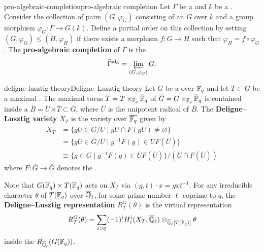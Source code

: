 \begin{topic}{pro-algebraic-completion}{pro-algebraic completion}
    Let $\Gamma$ be a  and $k$ be a . Consider the collection of pairs $(G, \varphi_G)$ consisting of an   $G$ over $k$ and a group morphism $\varphi_G \colon \Gamma \to G(k)$. Define a partial order on this collection by setting $(G, \varphi_G) \le (H, \varphi_H)$ if there exists a morphism $f \colon G \to H$ such that $\varphi_H = f \circ \varphi_G$. The \textbf{pro-algebraic completion} of $\Gamma$ is the 
    \[ \widehat{\Gamma}^\textup{alg} = \varprojlim_{(G, \varphi_G)} G . \]
\end{topic}

\begin{topic}{deligne-lusztig-theory}{Deligne--Lusztig theory}
    Let $G$ be a    over $\mathbb{F}_q$ and let $T \subset G$ be a maximal . The maximal torus $\overline{T} = T \times_{\mathbb{F}_q} \overline{\mathbb{F}}_q$ of $\overline{G} = G \times_{\mathbb{F}_q} \overline{\mathbb{F}}_q$ is contained inside a  $\overline{B} = \overline{U} \rtimes \overline{T} \subset \overline{G}$, where $\overline{U}$ is the unipotent radical of $\overline{B}$.
    The \textbf{Deligne--Lusztig variety} $X_T$ is the variety over $\overline{\mathbb{F}_q}$ given by
    \[ \begin{aligned}
        X_T &= \{ g \overline{U} \in \overline{G} / \overline{U} \mid g \overline{U} \cap F(g U) \ne \varnothing \} \\
            &= \{ g \overline{U} \in \overline{G} / \overline{U} \mid g^{-1} F(g) \in \overline{U} F(\overline{U}) \} \\
            &\cong \{ g \in G \mid g^{-1} F(g) \in \overline{U} F(\overline{U}) \} / (\overline{U} \cap F(\overline{U}))
    \end{aligned} \]
    where $F \colon \overline{G} \to \overline{G}$ denotes the .
    
    Note that $G(\mathbb{F}_q) \times T(\mathbb{F}_q)$ acts on $X_T$ via $(g, t) \cdot x = g x t^{-1}$. For any irreducible character $\theta$ of $T(\mathbb{F}_q)$ over $\overline{\mathbb{Q}}_\ell$, for some prime number $\ell$ coprime to $q$, the \textbf{Deligne--Lusztig representation} $R^G_T(\theta)$ is the virtual representation
    \[ R^G_T(\theta) = \sum_{i \ge 0} (-1)^i H_c^i(X_T, \overline{\mathbb{Q}}_\ell) \otimes_{\overline{\mathbb{Q}}_\ell[T(\mathbb{F}_q)]} \theta \]
    inside the  $R_{\overline{\mathbb{Q}}_\ell}(G(\mathbb{F}_q))$.
\end{topic}

